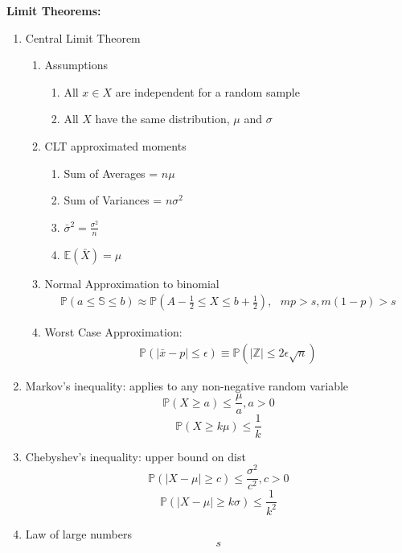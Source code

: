 \documentclass[12pt]{article}
\newcommand{\abs}[1]{\left| #1 \right|} %
\renewcommand{\=}[1]{\stackrel{#1}{=}} %
\theoremstyle{definition}
\theoremstyle{remark}
\begin{document}
  \textbf{Limit Theorems:}
  \begin{enumerate}
  \item Central Limit Theorem
    \begin{enumerate}
    \item Assumptions
      \begin{enumerate}
      \item All $x \in X$ are independent for a random sample
      \item All $X$ have the same distribution, $\mu$ and $\sigma$
      \end{enumerate}
    \item CLT approximated moments
      \begin{enumerate}
      \item Sum of Averages = $n\mu$
      \item Sum of Variances = $n\sigma^2$
      \item $\bar{\sigma}^2 = \frac{\sigma^2}{n}$
      \item $\mathbb{E}(\bar{X}) = \mu$
      \end{enumerate}

    \item Normal Approximation to binomial
      \begin{align*}
        \mathbb{P}(a \leq \mathbb{S} \leq b) \approx
        \mathbb{P}(A-\frac{1}{2} \leq X \leq b + \frac{1}{2}),\textrm{ } mp > s, m(1-p)>s
      \end{align*}
    \item Worst Case Approximation:
      \begin{align*}
        \mathbb{P}(\abs{\bar{x}-p} \leq \epsilon) \equiv
        \mathbb{P}(\abs{\mathbb{Z}} \leq 2\epsilon\sqrt{n})
      \end{align*}
    \end{enumerate}
  \item Markov's inequality: applies to any non-negative random variable
    \begin{equation}
      \mathbb{P}(X \geq a) \leq \frac{\mu}{a} , a >0
    \end{equation}
    \begin{equation}
      \mathbb{P}(X \geq k\mu) \leq \frac{1}{k}
    \end{equation}
  \item Chebyshev's inequality: upper bound on dist
    \begin{equation}
      \mathbb{P}(\abs{X-\mu} \geq c) \leq \frac{\sigma^2}{c^2}, c>0
    \end{equation}
    \begin{equation}
      \mathbb{P}(\abs{X-\mu} \geq k\sigma) \leq \frac{1}{k^2}
    \end{equation}
  \item Law of large numbers
    \begin{equation}
      s
    \end{equation}
  \end{enumerate}
\end{document}
